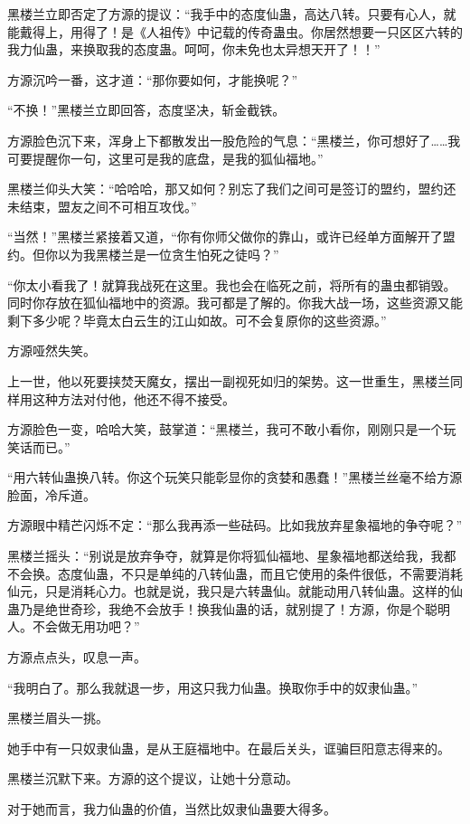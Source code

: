 \begin{this_body}
黑楼兰立即否定了方源的提议：“我手中的态度仙蛊，高达八转。只要有心人，就能戴得上，用得了！是《人祖传》中记载的传奇蛊虫。你居然想要一只区区六转的我力仙蛊，来换取我的态度蛊。呵呵，你未免也太异想天开了！！”

方源沉吟一番，这才道：“那你要如何，才能换呢？”

“不换！”黑楼兰立即回答，态度坚决，斩金截铁。

方源脸色沉下来，浑身上下都散发出一股危险的气息：“黑楼兰，你可想好了……我可要提醒你一句，这里可是我的底盘，是我的狐仙福地。”

黑楼兰仰头大笑：“哈哈哈，那又如何？别忘了我们之间可是签订的盟约，盟约还未结束，盟友之间不可相互攻伐。”

“当然！”黑楼兰紧接着又道，“你有你师父做你的靠山，或许已经单方面解开了盟约。但你以为我黑楼兰是一位贪生怕死之徒吗？”

“你太小看我了！就算我战死在这里。我也会在临死之前，将所有的蛊虫都销毁。同时你存放在狐仙福地中的资源。我可都是了解的。你我大战一场，这些资源又能剩下多少呢？毕竟太白云生的江山如故。可不会复原你的这些资源。”

方源哑然失笑。

上一世，他以死要挟焚天魔女，摆出一副视死如归的架势。这一世重生，黑楼兰同样用这种方法对付他，他还不得不接受。

方源脸色一变，哈哈大笑，鼓掌道：“黑楼兰，我可不敢小看你，刚刚只是一个玩笑话而已。”

“用六转仙蛊换八转。你这个玩笑只能彰显你的贪婪和愚蠢！”黑楼兰丝毫不给方源脸面，冷斥道。

方源眼中精芒闪烁不定：“那么我再添一些砝码。比如我放弃星象福地的争夺呢？”

黑楼兰摇头：“别说是放弃争夺，就算是你将狐仙福地、星象福地都送给我，我都不会换。态度仙蛊，不只是单纯的八转仙蛊，而且它使用的条件很低，不需要消耗仙元，只是消耗心力。也就是说，我只是六转蛊仙。就能动用八转仙蛊。这样的仙蛊乃是绝世奇珍，我绝不会放手！换我仙蛊的话，就别提了！方源，你是个聪明人。不会做无用功吧？”

方源点点头，叹息一声。

“我明白了。那么我就退一步，用这只我力仙蛊。换取你手中的奴隶仙蛊。”

黑楼兰眉头一挑。

她手中有一只奴隶仙蛊，是从王庭福地中。在最后关头，诓骗巨阳意志得来的。

黑楼兰沉默下来。方源的这个提议，让她十分意动。

对于她而言，我力仙蛊的价值，当然比奴隶仙蛊要大得多。


\end{this_body}
